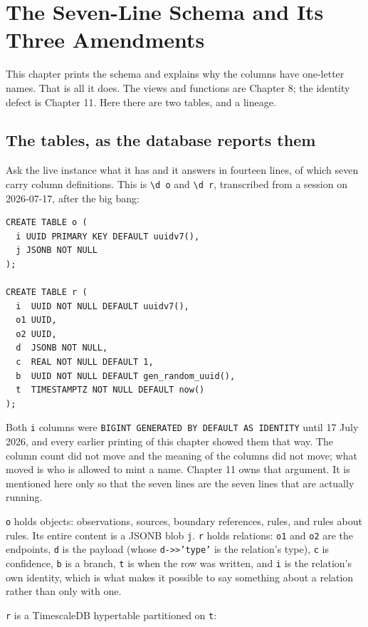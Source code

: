 \chapter{The Seven-Line Schema and Its Three Amendments}\label{ch:seven-lines}

This chapter prints the schema and explains why the columns have one-letter names. That is all it does. The views and functions are Chapter 8; the identity defect is Chapter 11. Here there are two tables, and a lineage.

\section{The tables, as the database reports them}

Ask the live instance what it has and it answers in fourteen lines, of which seven carry column definitions. This is \texttt{\textbackslash d o} and \texttt{\textbackslash d r}, transcribed from a session on 2026-07-17, after the big bang:

\begin{lstlisting}
CREATE TABLE o (
  i UUID PRIMARY KEY DEFAULT uuidv7(),
  j JSONB NOT NULL
);

CREATE TABLE r (
  i  UUID NOT NULL DEFAULT uuidv7(),
  o1 UUID,
  o2 UUID,
  d  JSONB NOT NULL,
  c  REAL NOT NULL DEFAULT 1,
  b  UUID NOT NULL DEFAULT gen_random_uuid(),
  t  TIMESTAMPTZ NOT NULL DEFAULT now()
);
\end{lstlisting}

Both \texttt{i} columns were \texttt{BIGINT GENERATED BY DEFAULT AS IDENTITY} until 17 July 2026, and every earlier printing of this chapter showed them that way. The column count did not move and the meaning of the columns did not move; what moved is who is allowed to mint a name. Chapter 11 owns that argument. It is mentioned here only so that the seven lines are the seven lines that are actually running.

\texttt{o} holds objects: observations, sources, boundary references, rules, and rules about rules. Its entire content is a JSONB blob \texttt{j}. \texttt{r} holds relations: \texttt{o1} and \texttt{o2} are the endpoints, \texttt{d} is the payload (whose \texttt{d->>'type'} is the relation's type), \texttt{c} is confidence, \texttt{b} is a branch, \texttt{t} is when the row was written, and \texttt{i} is the relation's own identity, which is what makes it possible to say something about a relation rather than only with one.

\texttt{r} is a TimescaleDB hypertable partitioned on \texttt{t}:

